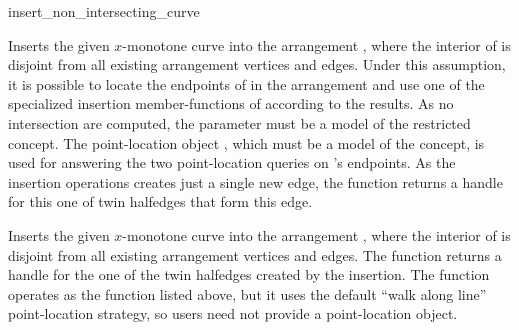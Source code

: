 
\ccRefPageBegin

\begin{ccRefFunction}{insert_non_intersecting_curve}


   {Inserts the given $x$-monotone curve  into the arrangement
    , where the interior of  is disjoint from all existing
    arrangement vertices and edges. Under this assumption, it is possible to
    locate the endpoints of  in the arrangement and use one of the
    specialized insertion member-functions of  according to the
    results. As no intersection are computed, the  parameter
    must be a model of the restricted  concept.
    The point-location object , which must be a model of the
     concept, is used for answering
    the two point-location queries on 's endpoints. As the insertion
    operations creates just a single new edge, the function returns a handle
    for this one of twin halfedges that form this edge.
    }

   {Inserts the given $x$-monotone curve  into the arrangement
    , where the interior of  is disjoint from all existing
    arrangement vertices and edges. The function returns a handle for the
    one of the twin halfedges created by the insertion.
    The function operates as the function listed above, but it uses the default
    ``walk along line'' point-location strategy, so users need not provide a
    point-location object.}

\end{ccRefFunction}

\ccRefPageEnd

